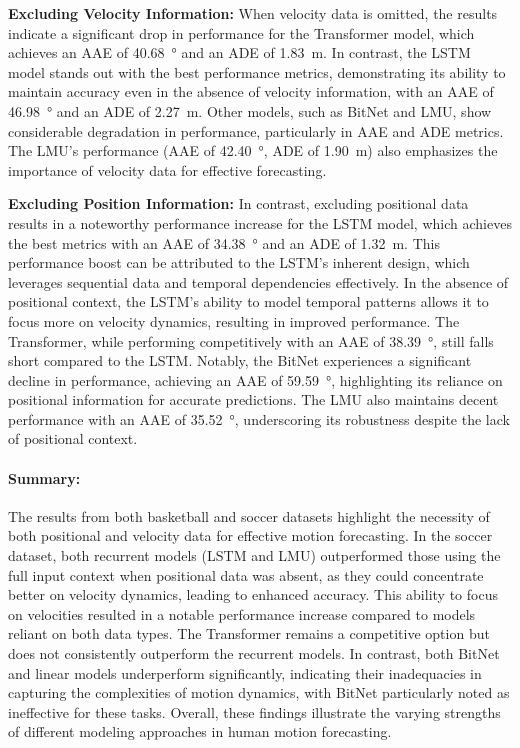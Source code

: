 \textbf{Excluding Velocity Information:} When velocity data is omitted, the results indicate a significant drop in performance for the Transformer model, which achieves an AAE of \SI{40.68}{\degree} and an ADE of \SI{1.83}{\meter}. In contrast, the LSTM model stands out with the best performance metrics, demonstrating its ability to maintain accuracy even in the absence of velocity information, with an AAE of \SI{46.98}{\degree} and an ADE of \SI{2.27}{\meter}. Other models, such as BitNet and LMU, show considerable degradation in performance, particularly in AAE and ADE metrics. The LMU's performance (AAE of \SI{42.40}{\degree}, ADE of \SI{1.90}{\meter}) also emphasizes the importance of velocity data for effective forecasting.

\textbf{Excluding Position Information:} In contrast, excluding positional data results in a noteworthy performance increase for the LSTM model, which achieves the best metrics with an AAE of \SI{34.38}{\degree} and an ADE of \SI{1.32}{\meter}. This performance boost can be attributed to the LSTM's inherent design, which leverages sequential data and temporal dependencies effectively. In the absence of positional context, the LSTM's ability to model temporal patterns allows it to focus more on velocity dynamics, resulting in improved performance. The Transformer, while performing competitively with an AAE of \SI{38.39}{\degree}, still falls short compared to the LSTM. Notably, the BitNet experiences a significant decline in performance, achieving an AAE of \SI{59.59}{\degree}, highlighting its reliance on positional information for accurate predictions. The LMU also maintains decent performance with an AAE of \SI{35.52}{\degree}, underscoring its robustness despite the lack of positional context.

\paragraph{Summary:} The results from both basketball and soccer datasets highlight the necessity of both positional and velocity data for effective motion forecasting. In the soccer dataset, both recurrent models (LSTM and LMU) outperformed those using the full input context when positional data was absent, as they could concentrate better on velocity dynamics, leading to enhanced accuracy. This ability to focus on velocities resulted in a notable performance increase compared to models reliant on both data types. The Transformer remains a competitive option but does not consistently outperform the recurrent models. In contrast, both BitNet and linear models underperform significantly, indicating their inadequacies in capturing the complexities of motion dynamics, with BitNet particularly noted as ineffective for these tasks. Overall, these findings illustrate the varying strengths of different modeling approaches in human motion forecasting.

